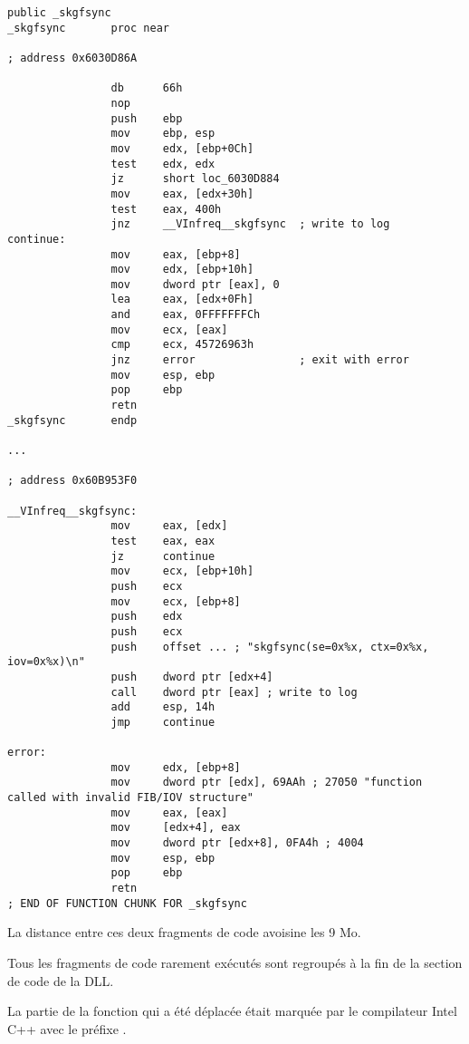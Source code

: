 \begin{lstlisting}[caption=orageneric11.dll (win32),style=customasmx86]
                public _skgfsync
_skgfsync       proc near

; address 0x6030D86A

                db      66h
                nop
                push    ebp
                mov     ebp, esp
                mov     edx, [ebp+0Ch]
                test    edx, edx
                jz      short loc_6030D884
                mov     eax, [edx+30h]
                test    eax, 400h
                jnz     __VInfreq__skgfsync  ; write to log
continue:
                mov     eax, [ebp+8]
                mov     edx, [ebp+10h]
                mov     dword ptr [eax], 0
                lea     eax, [edx+0Fh]
                and     eax, 0FFFFFFFCh
                mov     ecx, [eax]
                cmp     ecx, 45726963h
                jnz     error                ; exit with error
                mov     esp, ebp
                pop     ebp
                retn
_skgfsync       endp

...

; address 0x60B953F0

__VInfreq__skgfsync:
                mov     eax, [edx]
                test    eax, eax
                jz      continue
                mov     ecx, [ebp+10h]
                push    ecx
                mov     ecx, [ebp+8]
                push    edx
                push    ecx
                push    offset ... ; "skgfsync(se=0x%x, ctx=0x%x, iov=0x%x)\n"
                push    dword ptr [edx+4]
                call    dword ptr [eax] ; write to log
                add     esp, 14h
                jmp     continue

error:
                mov     edx, [ebp+8]
                mov     dword ptr [edx], 69AAh ; 27050 "function called with invalid FIB/IOV structure"
                mov     eax, [eax]
                mov     [edx+4], eax
                mov     dword ptr [edx+8], 0FA4h ; 4004
                mov     esp, ebp
                pop     ebp
                retn
; END OF FUNCTION CHUNK FOR _skgfsync
\end{lstlisting}

La distance entre ces deux fragments de code avoisine les 9 Mo.

Tous les fragments de code rarement exécutés sont regroupés à la fin de la section de code de la DLL.

La partie de la fonction qui a été déplacée était marquée par le compilateur Intel C++ avec le 
préfixe .

